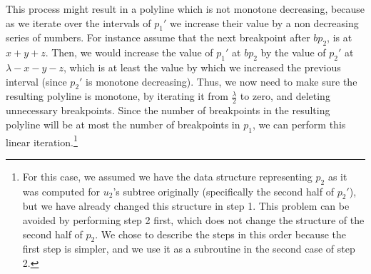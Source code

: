 \documentclass[11pt,a4paper]{article}
\theoremstyle{definition}
\theoremstyle{remark}
\begin{document}
\begin{enumerate}
This process might result in a polyline which is not monotone decreasing, because as we iterate over the intervals of $p_1'$ we increase their value by a non decreasing series of numbers. For instance assume that the next breakpoint after $bp_2$, is at $x+y+z$. Then, we would increase the value of $p_1'$ at $bp_2$ by the value of $p_2'$ at $\lambda-x-y-z$, which is at least the value by which we increased the previous interval (since $p_2'$ is monotone decreasing). Thus, we now need to make sure the resulting polyline is monotone, by iterating it from $\frac{\lambda}{2}$ to zero, and deleting unnecessary breakpoints. Since the number of breakpoints in the resulting polyline will be at most the number of breakpoints in $p_1$, we can perform this linear iteration.\footnote{For this case, we assumed we have the data structure representing $p_2$ as it was computed for $u_2$'s subtree originally (specifically the second half of $p_2'$), but we have already changed this structure in step 1. This problem can be avoided by performing step 2 first, which does not change the structure of the second half of $p_2$. We chose to describe the steps in this order because the first step is simpler, and we use it as a subroutine in the second case of step 2.}


\end{enumerate}
\end{document}
